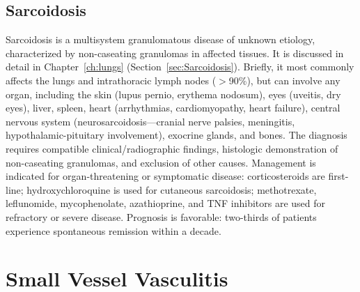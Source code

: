 \subsection{Sarcoidosis}
\label{sec:Sarcoidosis (Systemic)}
Sarcoidosis is a multisystem granulomatous disease of unknown etiology, characterized by non-caseating granulomas in affected tissues. It is discussed in detail in Chapter~\ref{ch:lungs} (Section~\ref{sec:Sarcoidosis}). Briefly, it most commonly affects the lungs and intrathoracic lymph nodes ($>$90\%), but can involve any organ, including the skin (lupus pernio, erythema nodosum), eyes (uveitis, dry eyes), liver, spleen, heart (arrhythmias, cardiomyopathy, heart failure), central nervous system (neurosarcoidosis---cranial nerve palsies, meningitis, hypothalamic-pituitary involvement), exocrine glands, and bones. The diagnosis requires compatible clinical/radiographic findings, histologic demonstration of non-caseating granulomas, and exclusion of other causes. Management is indicated for organ-threatening or symptomatic disease: corticosteroids are first-line; hydroxychloroquine is used for cutaneous sarcoidosis; methotrexate, leflunomide, mycophenolate, azathioprine, and TNF inhibitors are used for refractory or severe disease. Prognosis is favorable: two-thirds of patients experience spontaneous remission within a decade.

\section{Small Vessel Vasculitis}








\label{sec:Small Vessel Vasculitis}

